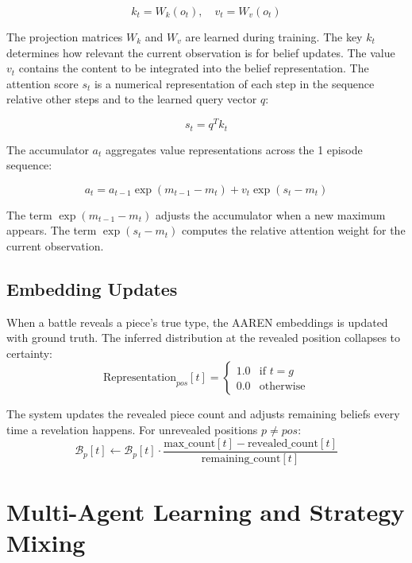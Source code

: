 \begin{equation}
k_t = W_k(o_t), \quad v_t = W_v(o_t)
\end{equation}

The projection matrices $W_k$ and $W_v$ are learned during training. The key $k_t$ determines how relevant the current observation is for belief updates. The value $v_t$ contains the content to be integrated into the belief representation. The attention score $s_t$ is a numerical representation of each step in the sequence relative other steps and to the learned query vector $q$:

\begin{equation}
s_t = q^T k_t
\end{equation}

The accumulator $a_t$ aggregates value representations across the 1 episode sequence:

\begin{equation}
a_t = a_{t-1} \exp(m_{t-1} - m_t) + v_t \exp(s_t - m_t)
\end{equation}

The term $\exp(m_{t-1} - m_t)$ adjusts the accumulator when a new maximum appears. The term $\exp(s_t - m_t)$ computes the relative attention weight for the current observation. 


\subsection{Embedding Updates}

When a battle reveals a piece's true type, the AAREN embeddings is updated with ground truth. The inferred distribution at the revealed position collapses to certainty:
\begin{equation}
\text{Representation}_{pos}[t] = \begin{cases}
1.0 & \text{if } t = g \\
0.0 & \text{otherwise}
\end{cases}
\end{equation}

The system updates the revealed piece count and adjusts remaining beliefs every time a revelation happens. For unrevealed positions $p \neq pos$:
\begin{equation}
\mathcal{B}_p[t] \leftarrow \mathcal{B}_p[t] \cdot \frac{\text{max\_count}[t] - \text{revealed\_count}[t]}{\text{remaining\_count}[t]}
\end{equation}


\section{Multi-Agent Learning and Strategy Mixing}

